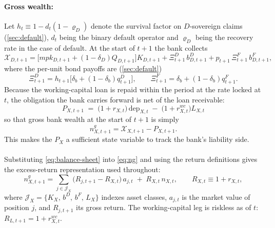\paragraph{Gross wealth:}
Let $h_t\equiv1-d_t(1-\varrho_D)$ denote the survival factor on $D$-sovereign claims (\cref{sec:default}), $d_t$ being the binary default operator and $\varrho_D$ being the recovery rate in the case of default. At the start of $t+1$ the bank collects
\begin{equation}
\mathcal{X}_{D,t+1}
=\bigl[mpk_{D,t+1}+(1-\delta_D)Q_{D,t+1}\bigr]K_{D,t+1}
+\Xi^{D}_{t+1}\,b^{D}_{D,t+1}
+p_{t+1}\,\Xi^{F}_{t+1}\,b^{F}_{D,t+1},
\label{eq:asset-payoff}
\end{equation}
where the per-unit bond payoffs are (\cref{sec:default})
\begin{equation}
\Xi^{D}_{t+1}=h_{t+1}\bigl[\delta_b+(1-\delta_b)q^{D}_{t+1}\bigr],
\qquad
\Xi^{F}_{t+1}=\delta_b+(1-\delta_b)q^{F}_{t+1}.
\label{eq:bond-payoff}
\end{equation}
Because the working-capital loan is repaid within the period at the rate locked at $t$, the obligation the bank carries forward is net of the loan receivable:
\begin{equation}
\;P_{X,t+1}\;=\;\bigl(1+r_{X,t}\bigr)\,\mathrm{dep}_{X,t}
\;-\;\bigl(1+r^{wc}_{X,t}\bigr)L_{X,t}\;
\label{eq:P-state}
\end{equation}
so that gross bank wealth at the start of $t+1$ is simply
\begin{equation}
n^{g}_{X,t+1}=\mathcal{X}_{X,t+1}-P_{X,t+1}.
\label{eq:ng}
\end{equation}
This makes the $P_{X}$ a sufficient state variable to track the bank's liability side. \\
\\
Substituting \eqref{eq:balance-sheet} into \eqref{eq:ng} and using the return
definitions gives the excess-return representation used throughout:
\begin{equation}
n^{g}_{X,t+1}
=\sum_{j\in\mathcal{J}_X}\bigl(R_{j,t+1}-R_{X,t}\bigr)\,a_{j,t}
\;+\;R_{X,t}\,n_{X,t},
\qquad R_{X,t}\equiv1+r_{X,t},
\label{eq:ng-excess}
\end{equation}
where $\mathcal{J}_X=\{K_X,\,b^{D},\,b^{F},\,L_X\}$ indexes asset classes, $a_{j,t}$ is
the market value of position $j$, and $R_{j,t+1}$ its gross return. The
working-capital leg is riskless as of $t$: $R_{L,t+1}=1+r^{wc}_{X,t}$.

